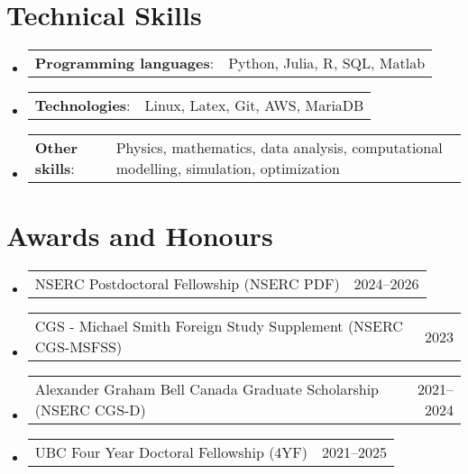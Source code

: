 \documentclass[letterpaper,11pt]{article}
\makeatletter
\newcommand{\SkillsItem}[2]{
	\item{\vspace{-1pt}
		\begin{tabular*}{0.97\textwidth}{l l}
			{\textbf{#1}:} & {#2}
		\end{tabular*}
		\vspace{-5pt}
	}
}
\newcommand{\AwardsItem}[2]{
	\item{\vspace{-1pt}
		\begin{tabular*}{0.97\textwidth}{l@{\extracolsep{\fill}}r}
			{#1} & {#2}
		\end{tabular*}
		\vspace{-5pt}
	}
}
\makeatother
\begin{document}
\section*{Technical Skills}
\begin{itemize}[leftmargin=*]
	\SkillsItem{Programming languages}{Python, Julia, R, SQL, Matlab}
	\SkillsItem{Technologies}{Linux, Latex, Git, AWS, MariaDB}
	\SkillsItem{Other skills}{Physics, mathematics, data analysis, computational modelling, simulation, optimization}
\end{itemize}

\section*{Awards and Honours}
\begin{itemize}[leftmargin=*]
	\AwardsItem{NSERC Postdoctoral Fellowship (NSERC PDF)}{2024--2026}
	\AwardsItem{CGS - Michael Smith Foreign Study Supplement (NSERC CGS-MSFSS)}{2023}
	\AwardsItem{Alexander Graham Bell Canada Graduate Scholarship (NSERC CGS-D)}{2021--2024}
	\AwardsItem{UBC Four Year Doctoral Fellowship (4YF)}{2021--2025}
\end{itemize}


\end{document}
